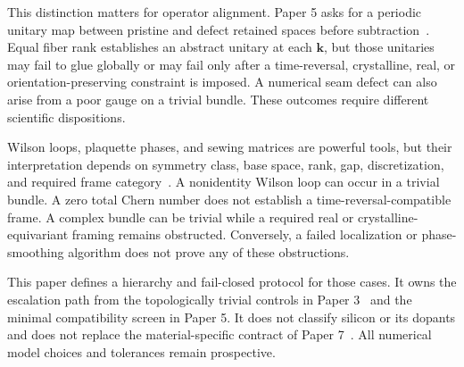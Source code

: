 \documentclass[11pt]{article}
\begin{document}
This distinction matters for operator alignment. Paper 5 asks for a periodic unitary map
between pristine and defect retained spaces before subtraction~\cite{Ragasa2026e}. Equal
fiber rank establishes an abstract unitary at each $\mathbf k$, but those unitaries may
fail to glue globally or may fail only after a time-reversal, crystalline, real, or
orientation-preserving constraint is imposed. A numerical seam defect can also arise
from a poor gauge on a trivial bundle. These outcomes require different scientific
dispositions.

Wilson loops, plaquette phases, and sewing matrices are powerful tools, but their
interpretation depends on symmetry class, base space, rank, gap, discretization, and
required frame category~\cite{fukui2005,fukane2006,soluyanov2011,yu2011}. A nonidentity
Wilson loop can occur in a trivial bundle. A zero total Chern number does not establish a
time-reversal-compatible frame. A complex bundle can be trivial while a required real
or crystalline-equivariant framing remains obstructed. Conversely, a failed localization
or phase-smoothing algorithm does not prove any of these obstructions.

This paper defines a hierarchy and fail-closed protocol for those cases. It owns the
escalation path from the topologically trivial controls in Paper 3~\cite{Ragasa2026c} and
the minimal compatibility screen in Paper 5. It does not classify silicon or its dopants
and does not replace the material-specific contract of Paper 7~\cite{Ragasa2026g}. All
numerical model choices and tolerances remain prospective.
\end{document}
